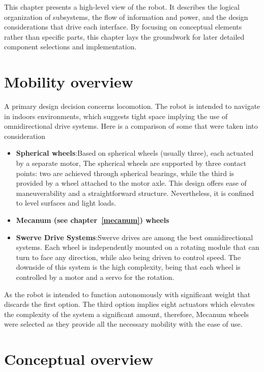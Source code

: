 This chapter presents a high-level view of the robot. It describes the logical organization of subsystems, the flow of information and power, and the design considerations that drive each interface. By focusing on conceptual elements rather than specific parts, this chapter lays the groundwork for later detailed component selections and implementation.

\section{Mobility overview}

A primary design decision concerns locomotion. The robot is intended to navigate in indoors environments, which suggests tight space implying the use of omnidirectional drive systems.
Here is a comparison of some that were taken into consideration~\cite{Siegwart2011}

\begin{itemize}
  \item \textbf{Spherical wheels}:Based on spherical wheels (usually three), each actuated by a separate motor, The spherical wheels are supported by three contact points: two are achieved through spherical bearings, while the third is provided by a wheel attached to the motor axle. This design offers ease of maneuverability and a straightforward structure. Nevertheless, it is confined to level surfaces and light loads.
  \item \textbf{Mecanum (see chapter~\ref{mecanum}) wheels}
  \item \textbf{Swerve Drive Systems}:Swerve drives are among the best omnidirectional systems. Each wheel is independently mounted on a rotating module that can turn to face any direction, while also being driven to control speed. The downside of this system is the high complexity, being that each wheel is controlled by a motor and a \gls{servo} for the rotation.
\end{itemize}

As the robot is intended to function autonomously with significant weight that discards the first option. The third option implies eight actuators which elevates the complexity of the system a significant amount, therefore, Mecanum wheels were selected as they provide all the necessary mobility with the ease of use.

\section{Conceptual overview}\label{sec:conceptual_overview}

